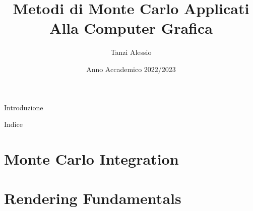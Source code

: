 \documentclass[14pt, aspectratio=169]{beamer}
\title{Metodi di Monte Carlo Applicati Alla Computer Grafica}
\author{Tanzi Alessio}
\date{Anno Accademico 2022/2023}
\institute[]{Politecnico di Bari}
\theoremstyle{theoremdd}
\begin{document}
	\begin{frame}
		\maketitle
	\end{frame}

	\begin{frame}{Introduzione}
	\end{frame}

	\begin{frame}{Indice}
		\tableofcontents
	\end{frame}

	\section{Monte Carlo Integration}
	
	\section{Rendering Fundamentals}
\end{document}
